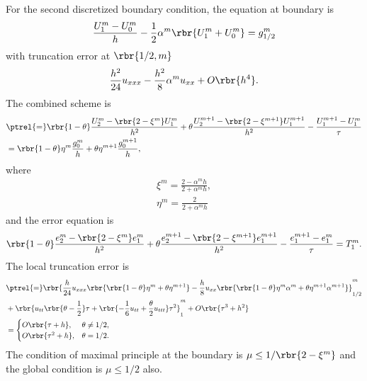 \documentclass[english, nochinese]{pnote}
\begin{document}
For the second discretized boundary condition, the equation at boundary is
\begin{equation}
\frac{ U_1^m - U_0^m }{h} - \frac{1}{2} \alpha^m \rbr{ U_1^m + U_0^m } = g_{ 1 / 2 }^m
\end{equation}
with truncation error at $ \rbr{ 1 / 2, m } $
\begin{equation}
\frac{h^2}{24} u_{ x x x } - \frac{h^2}{8} \alpha^m u_{ x x } + O \rbr{h^4}.
\end{equation}
The combined scheme is
\begin{equation}
\begin{split}
&\ptrel{=} \rbr{ 1 - \theta } \frac{ U_2^m - \rbr{ 2 - \xi^m } U_1^m }{h^2} + \theta \frac{ U_2^{ m + 1 } - \rbr{ 2 - \xi^{ m + 1 } } U_1^{ m + 1 } }{h^2} - \frac{ U_1^{ m + 1 } - U_1^m }{\tau} \\
&= \rbr{ 1 - \theta } \eta^m \frac{g_0^m}{h} + \theta \eta^{ m + 1 } \frac{g_0^{ m + 1 }}{h},
\end{split}
\end{equation}
where
\begin{gather}
\xi^m = \frac{ 2 - \alpha^m h }{ 2 + \alpha^m h }, \\
\eta^m = \frac{2}{ 2 + \alpha^m h }
\end{gather}
and the error equation is
\begin{equation}
\rbr{ 1 - \theta } \frac{ e_2^m - \rbr{ 2 - \xi^m } e_1^m }{h^2} + \theta \frac{ e_2^{ m + 1 } - \rbr{ 2 - \xi^{ m + 1 } } e_1^{ m + 1 } }{h^2} - \frac{ e_1^{ m + 1 } - e_1^m }{\tau} = T_1^m.
\end{equation}
The local truncation error is
\begin{equation}
\begin{split}
&\ptrel{=} \rbr{ \frac{h}{24} u_{ x x x } \rbr{ \rbr{ 1 - \theta } \eta^m + \theta \eta^{ m + 1 } } - \frac{h}{8} u_{ x x } \rbr{ \rbr{ 1 - \theta } \eta^m \alpha^m + \theta \eta^{ m + 1 } \alpha^{ m + 1 } } }_{ 1 / 2 }^m \\
&+ \rbr{ u_{ t t } \rbr{ \theta - \frac{1}{2} } \tau + \rbr{ -\frac{1}{6} u_{ t t } + \frac{\theta}{2} u_{ t t t } } \tau^2 }_1^m + O \rbr{ \tau^3 + h^2 } \\
&=
\begin{cases}
O \rbr{ \tau + h }, & \theta \neq 1 / 2, \\
O \rbr{ \tau^2 + h }, & \theta = 1 / 2.
\end{cases}
\end{split}
\end{equation}
The condition of maximal principle at the boundary is $ \mu \le 1 / \rbr{ 2 - \xi^m } $ and the global condition is $ \mu \le 1 / 2 $ also.
\end{document}
